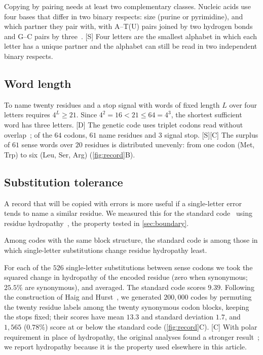 \documentclass[10pt,twocolumn,a4paper]{article}
\newcommand{\D}{\textsf{[D]}}
\newcommand{\Sup}{\textsf{[S]}}
\newcommand{\C}{\textsf{[C]}}
\begin{document}
Copying by pairing needs at least two complementary classes. Nucleic acids
use four bases that differ in two binary respects: size (purine or
pyrimidine), and which partner they pair with, with A--T(U) pairs joined by
two hydrogen bonds and G--C pairs by three~\citep{watson1953}. \Sup{} Four
letters are the smallest alphabet in which each letter has a unique partner
and the alphabet can still be read in two independent binary respects.

\subsection{Word length}

To name twenty residues and a stop signal with words of fixed length $L$ over
four letters requires $4^L\ge21$. Since $4^2=16<21\le64=4^3$, the shortest
sufficient word has three letters. \D{} The genetic code uses triplet codons
read without overlap~\citep{crick1961}; of the $64$ codons, $61$ name residues
and $3$ signal stop. \Sup\C{} The surplus of $61$ sense words over $20$
residues is distributed unevenly: from one codon (Met, Trp) to six (Leu, Ser,
Arg) (\cref{fig:record}B).

\subsection{Substitution tolerance}

A record that will be copied with errors is more useful if a single-letter
error tends to name a similar residue. We measured this for the standard
code~\citep{elzanowski2019} using residue hydropathy~\citep{kyte1982}, the
property tested in \cref{sec:boundary}.

\begin{prediction}
\label{pred:code}
Among codes with the same block structure, the standard code is among those
in which single-letter substitutions change residue hydropathy least.
\end{prediction}

For each of the $526$ single-letter substitutions between sense codons we
took the squared change in hydropathy of the encoded residue (zero when
synonymous; $25.5\%$ are synonymous), and averaged. The standard code scores
$9.39$. Following the construction of Haig and Hurst~\citep{haig1991}, we
generated $200{,}000$ codes by permuting the twenty residue labels among the
twenty synonymous codon blocks, keeping the stops fixed; their scores have
mean $13.3$ and standard deviation $1.7$, and $1{,}565$ ($0.78\%$) score at or
below the standard code (\cref{fig:record}C). \C{} With polar requirement in
place of hydropathy, the original analyses found a stronger
result~\citep{haig1991,freeland1998}; we report hydropathy because it is the
property used elsewhere in this article.
\end{document}
